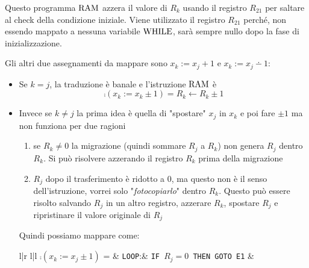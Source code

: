 Questo programma $\text{RAM}$ azzera il valore di $R_k$ usando il registro $R_{21}$ per saltare al check della condizione iniziale. Viene utilizzato il registro $R_{21}$ perché, non essendo mappato a nessuna variabile $\text{WHILE}$, sarà sempre nullo dopo la fase di inizializzazione.

Gli altri due assegnamenti da mappare sono $x_k:= x_j+1$ e $x_k := x_j \dotminus 1$:
\begin{itemize}
	\item Se $k=j$, la traduzione è banale e l'istruzione $\text{RAM}$ è
	$$ \comp(x_k := x_k \pm 1) = R_k \leftarrow R_k \pm 1 $$ \vspace{-0.75cm}
	\item Invece se $k \neq j$ la prima idea è quella di "spostare" $x_j$ in $x_k$ e poi fare $\pm 1$ ma non funziona per due ragioni
	\begin{enumerate}
		\item se $R_k \neq 0$ la migrazione (quindi sommare $R_j$ a $R_k$) non genera $R_j$ dentro $R_k$. Si può risolvere azzerando il registro $R_k$ prima della migrazione
		\item $R_j$ dopo il trasferimento è ridotto a 0, ma questo non è il senso dell'istruzione, vorrei solo "\textit{fotocopiarlo}" dentro $R_k$. Questo può essere risolto salvando $R_j$ in un altro registro, azzerare $R_k$, spostare $R_j$ e ripristinare il valore originale di $R_j$
	\end{enumerate}
	Quindi possiamo mappare come:
	\begin{center}
		\renewcommand{\arraystretch}{1.25}
		\begin{tabular}{l|r l|l}
			$\comp (x_k := x_j \pm 1)$ = & \texttt{LOOP}:& \texttt{IF $R_j = 0$ THEN GOTO E1}
			&
\end{tabular}
\end{center}
\end{itemize}
